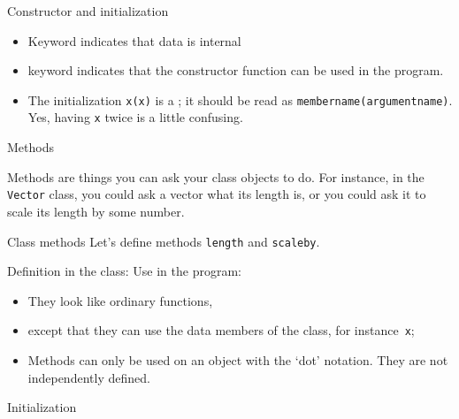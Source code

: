 \begin{block}{Constructor and initialization}
  \begin{itemize}
  \item Keyword  indicates that data is internal
  \item keyword  indicates that the constructor
    function can be used in the program.
  \item The initialization \lstinline{x(x)} is a
    ; it should be read as
    \lstinline{membername(argumentname)}.
    Yes, having \lstinline{x} twice is a little confusing.
  \end{itemize}
\end{block}

\begin{comment}
  Above you had a declaration \lstinline{Vector v} which was not just a
  declaration: it called the so-called \indextermsub{default}{constructor},
  which has no arguments, and does nothing.
\end{comment}

 {Methods}

Methods are things you can ask your class objects to do. For instance,
in the \lstinline{Vector} class, you could ask a vector what its length is,
or you could ask it to scale its length by some number.

\begin{block}{Class methods}
  \label{sl:method-define}
  Let's define methods \lstinline{length} and \lstinline{scaleby}.

  \begin{multicols}{2}
    Definition in the class:
    \columnbreak
    Use in the program:
  \end{multicols}

  \begin{itemize}
  \item They look like ordinary functions,
  \item except that they can use the data members of the class, for
    instance~\lstinline{x};
  \item Methods can only be used on an object with the `dot' notation.
    They are not independently defined.
  \end{itemize}
\end{block}

 {Initialization}

